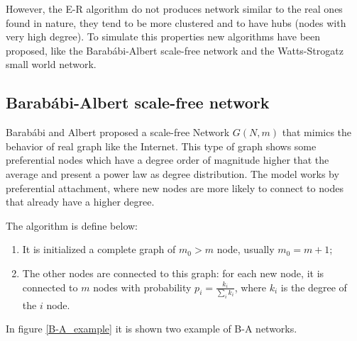 However, the E-R algorithm do not produces network similar to the real ones found in nature, they tend to be more clustered and to have hubs (nodes with very high degree). To simulate this properties new algorithms have been proposed, like the Barab\'abi-Albert scale-free network and the Watts-Strogatz small world network.

\subsection{Barab\'abi-Albert scale-free network}
Barab\'abi and Albert proposed a scale-free Network $G(N, m)$ \cite{Barabasi_Albert_1999} that mimics the behavior of real graph like the Internet. This type of graph shows some preferential nodes which have a degree order of magnitude higher that the average and present a power law as degree distribution.
The model works by preferential attachment, where new nodes are more likely to connect to nodes that already have a higher degree. 

The algorithm is define below:
\begin{enumerate}
    \item It is initialized a complete graph of $m_0 > m$ node, usually $m_0 = m+1$;
    \item The other nodes are connected to this graph: for each new node, it is connected to $m$ nodes with probability $p_i = \frac{k_i}{\sum_i k_i}$, where $k_i$ is the degree of the $i$ node.
\end{enumerate}
In figure \ref{B-A_example} it is shown two example of B-A networks.

